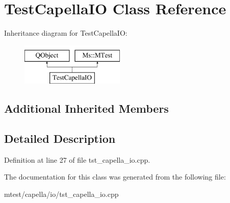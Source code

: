 \hypertarget{class_test_capella_i_o}{}\section{Test\+Capella\+IO Class Reference}
\label{class_test_capella_i_o}
Inheritance diagram for Test\+Capella\+IO\+:\begin{figure}[H]
\begin{center}
\leavevmode
\includegraphics[height=2.000000cm]{class_test_capella_i_o}
\end{center}
\end{figure}
\subsection*{Additional Inherited Members}


\subsection{Detailed Description}


Definition at line 27 of file tst\+\_\+capella\+\_\+io.\+cpp.



The documentation for this class was generated from the following file\+:\begin{DoxyCompactItemize}
\item 
mtest/capella/io/tst\+\_\+capella\+\_\+io.\+cpp\end{DoxyCompactItemize}
